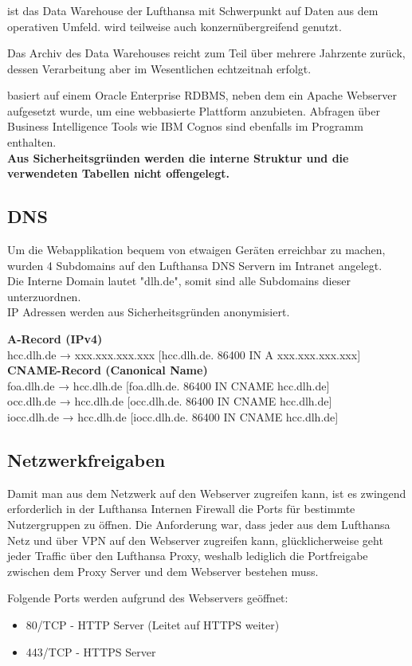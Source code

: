 	\subsubsection{}
	 ist das Data Warehouse der Lufthansa mit Schwerpunkt auf Daten aus dem operativen Umfeld.  wird teilweise auch konzernübergreifend genutzt.

	Das Archiv des Data Warehouses reicht zum Teil über mehrere Jahrzente zurück, dessen Verarbeitung aber im Wesentlichen echtzeitnah erfolgt.

	 basiert auf einem Oracle Enterprise RDBMS, neben dem ein Apache Webserver aufgesetzt wurde, um eine webbasierte Plattform anzubieten. Abfragen über Business Intelligence Tools wie IBM Cognos sind ebenfalls im Programm enthalten.\\
	\textbf{Aus Sicherheitsgründen werden die interne Struktur und die verwendeten Tabellen nicht offengelegt.}

	\subsection{DNS}
	Um die Webapplikation bequem von etwaigen Geräten erreichbar zu machen, wurden 4 Subdomains auf den Lufthansa DNS Servern im Intranet angelegt.\\
	Die Interne Domain lautet "dlh.de", somit sind alle Subdomains dieser unterzuordnen. \\

	IP Adressen werden aus Sicherheitsgründen anonymisiert.

	\vspace{16pt}

	\textbf{A-Record (IPv4)}\\
	hcc.dlh.de → xxx.xxx.xxx.xxx [hcc.dlh.de. 86400 IN A xxx.xxx.xxx.xxx]\\

	\textbf{CNAME-Record (Canonical Name)}\\
	foa.dlh.de → hcc.dlh.de [foa.dlh.de. 86400 IN CNAME hcc.dlh.de]\\
	occ.dlh.de → hcc.dlh.de [occ.dlh.de. 86400 IN CNAME hcc.dlh.de]\\
	iocc.dlh.de → hcc.dlh.de [iocc.dlh.de. 86400 IN CNAME hcc.dlh.de]\\

	\subsection{Netzwerkfreigaben}
	Damit man aus dem Netzwerk auf den Webserver zugreifen kann, ist es zwingend erforderlich in der Lufthansa Internen Firewall die Ports für bestimmte Nutzergruppen zu öffnen.
	Die Anforderung war, dass jeder aus dem Lufthansa Netz und über VPN auf den Webserver zugreifen kann, glücklicherweise geht jeder Traffic über den Lufthansa Proxy, weshalb lediglich die Portfreigabe zwischen dem Proxy Server und dem Webserver bestehen muss.
	
	Folgende Ports werden aufgrund des Webservers geöffnet:

	\begin{itemize}
		\item 80/TCP - HTTP Server (Leitet auf HTTPS weiter)
		\item 443/TCP - HTTPS Server
	\end{itemize}